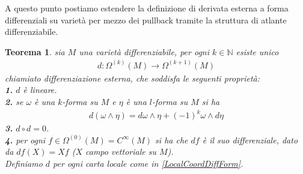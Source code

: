 \documentclass[oneside, 11pt]{amsbook}
\newcommand{\0}{{(0)}}
\newcommand{\3}{{(3)}}
\theoremstyle{colonplain}
\newtheorem{thm}{Teorema}[chapter]
\theoremstyle{colondefinition}
\theoremstyle{colonremark}
\numberwithin{equation}{chapter}
\begin{document}
A questo punto postiamo estendere la definizione di derivata esterna a forma differenziali su varietà per mezzo dei pullback tramite la struttura di atlante differenziabile.
\begin{thm} sia $M$ una varietà differenziabile, per ogni $k \in \mathbb{N}$ esiste unico
\begin{align}
    d : \Omega^{(k)}(M) \longrightarrow \Omega^{(k + 1)}(M)
\end{align}
chiamiato \textit{differenziazione esterna}, che soddisfa le seguenti proprietà: \\
\textbf{1.} $d$ è lineare. \\
\textbf{2.} se $\omega$ è una $k$-forma su $M$ e $\eta$ è una $l$-forma su $M$ si ha
\begin{align}
    d(\omega \wedge \eta) = d\omega \wedge \eta + (-1)^k\omega \wedge d\eta
\end{align}
\textbf{3.} $d \circ d = 0$. \\
\textbf{4.} per ogni $f \in \Omega^{(0)}(M) = C^\infty(M)$ si ha che $df$ è il suo differenziale, dato da $df(X) = Xf$ ($X$ campo vettoriale su $M$). \\
Definiamo $d$ per ogni carta locale come in \eqref{LocalCoordDiffForm}.
\end{thm}
\end{document}
